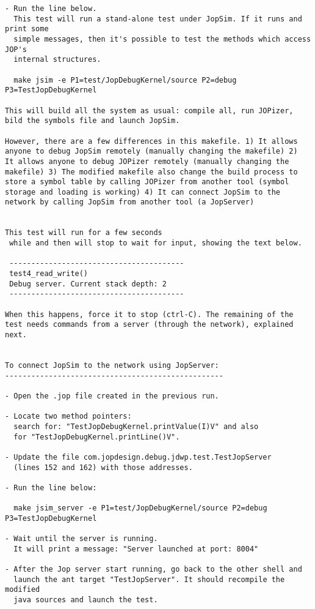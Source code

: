 \begin{verbatim}
- Run the line below.
  This test will run a stand-alone test under JopSim. If it runs and print some
  simple messages, then it's possible to test the methods which access JOP's
  internal structures.

  make jsim -e P1=test/JopDebugKernel/source P2=debug P3=TestJopDebugKernel

This will build all the system as usual: compile all, run JOPizer,
bild the symbols file and launch JopSim.

However, there are a few differences in this makefile. 1) It allows
anyone to debug JopSim remotely (manually changing the makefile) 2)
It allows anyone to debug JOPizer remotely (manually changing the
makefile) 3) The modified makefile also change the build process to
store a symbol table by calling JOPizer from another tool (symbol
storage and loading is working) 4) It can connect JopSim to the
network by calling JopSim from another tool (a JopServer)


This test will run for a few seconds
 while and then will stop to wait for input, showing the text below.

 ----------------------------------------
 test4_read_write()
 Debug server. Current stack depth: 2
 ----------------------------------------

When this happens, force it to stop (ctrl-C). The remaining of the
test needs commands from a server (through the network), explained
next.


To connect JopSim to the network using JopServer:
--------------------------------------------------

- Open the .jop file created in the previous run.

- Locate two method pointers:
  search for: "TestJopDebugKernel.printValue(I)V" and also
  for "TestJopDebugKernel.printLine()V".

- Update the file com.jopdesign.debug.jdwp.test.TestJopServer
  (lines 152 and 162) with those addresses.

- Run the line below:

  make jsim_server -e P1=test/JopDebugKernel/source P2=debug P3=TestJopDebugKernel

- Wait until the server is running.
  It will print a message: "Server launched at port: 8004"

- After the Jop server start running, go back to the other shell and
  launch the ant target "TestJopServer". It should recompile the modified
  java sources and launch the test.


\end{verbatim}
